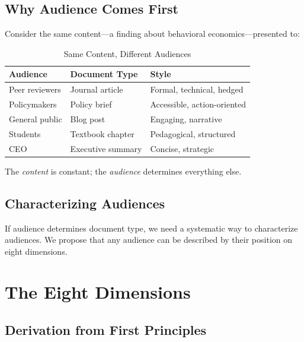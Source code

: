 \subsection{Why Audience Comes First}

Consider the same content---a finding about behavioral economics---presented to:

\begin{table}[htbp]
\centering
\caption{Same Content, Different Audiences}
\label{tab:audience-examples}
\renewcommand{\arraystretch}{1.3}
\begin{tabular}{@{}lll@{}}
\toprule
\textbf{Audience} & \textbf{Document Type} & \textbf{Style} \\
\midrule
Peer reviewers & Journal article & Formal, technical, hedged \\
Policymakers & Policy brief & Accessible, action-oriented \\
General public & Blog post & Engaging, narrative \\
Students & Textbook chapter & Pedagogical, structured \\
CEO & Executive summary & Concise, strategic \\
\bottomrule
\end{tabular}
\end{table}

The \textit{content} is constant; the \textit{audience} determines everything else.

\subsection{Characterizing Audiences}

If audience determines document type, we need a systematic way to characterize
audiences. We propose that any audience can be described by their position
on eight dimensions.


\section{The Eight Dimensions}
\label{sec:doctype-theory-dimensions}

\subsection{Derivation from First Principles}

